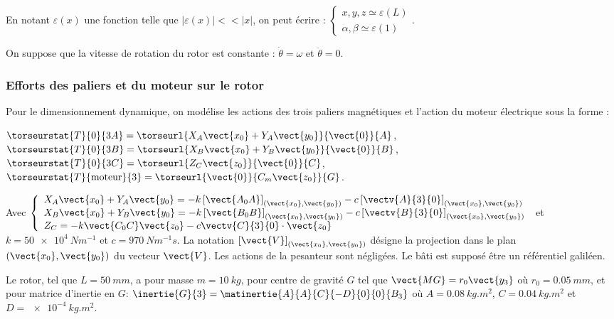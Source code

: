 \begin{multicols}{2}
En notant $\varepsilon(x)$ une fonction telle que $|\varepsilon(x)|<<|x|$, on peut écrire :
$\left\{
\begin{array}{l}
x,y,z \simeq \varepsilon(L) \\
\alpha, \beta \simeq \varepsilon(1)
\end{array}
\right.
$.

On suppose que la vitesse de rotation du rotor est constante : $\dot{\theta}=\omega$ et $\ddot{\theta}=0$.

\subsubsection*{Efforts des paliers et du moteur sur le rotor}

Pour le dimensionnement dynamique, on modélise les actions des trois paliers
magnétiques et l'action du moteur électrique sous la forme :

$\torseurstat{T}{0}{3A} = \torseurl{X_A\vect{x_0}+Y_A\vect{y_0}}{\vect{0}}{A}$, 
$\torseurstat{T}{0}{3B} = \torseurl{X_B\vect{x_0}+Y_B\vect{y_0}}{\vect{0}}{B}$,
$\torseurstat{T}{0}{3C} = \torseurl{Z_C\vect{z_0}}{\vect{0}}{C}$,
$\torseurstat{T}{\text{moteur}}{3} = \torseurl{\vect{0}}{C_m\vect{z_0}}{G}$.

Avec 
$\left\{
\begin{array}{l}
X_A\vect{x_0}+Y_A\vect{y_0} = -k\left[\vect{A_0 A}\right]_{\left(\vect{x_0},\vect{y_0} \right)} -c\left[ \vectv{A}{3}{0}\right]_{\left(\vect{x_0},\vect{y_0} \right)} \\
X_B\vect{x_0}+Y_B\vect{y_0} = -k\left[\vect{B_0 B}\right]_{\left(\vect{x_0},\vect{y_0} \right)} -c\left[ \vectv{B}{3}{0}\right]_{\left(\vect{x_0},\vect{y_0} \right)} \\
Z_C = -k \vect{C_0 C}\vect{z_0}-c\vectv{C}{3}{0}\cdot \vect{z_0}
\end{array}
\right.$
et $k=\SI{50e4}{Nm^{-1}}$ et $c=\SI{970}{Nm^{-1}s}$. La notation $\left[\vect{V}\right]_{\left(\vect{x_0},\vect{y_0} \right)}$  désigne la projection dans le plan $\left(\vect{x_0},\vect{y_0} \right)$ du vecteur $\vect{V}$.
Les actions de la pesanteur sont négligées. Le bâti est supposé être un référentiel
galiléen.


Le rotor, tel que $L=\SI{50}{mm}$, a pour masse $m=\SI{10}{kg}$, pour centre de gravité $G$
tel que $\vect{MG}=r_0\vect{y_3}$ où $r_0=\SI{0,05}{mm}$, et pour matrice d'inertie en $G$:
$\inertie{G}{3}=\matinertie{A}{A}{C}{-D}{0}{0}{B_3}$ où $A=\SI{0,08}{kg.m^2}$, $C=\SI{0,04}{kg.m^2}$ et $D=\SI{e-4}{kg.m^2}$.


\end{multicols}
